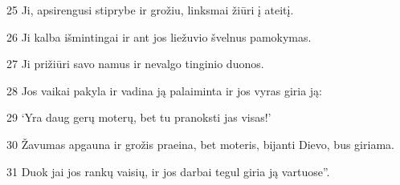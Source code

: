 \par 25 Ji, apsirengusi stiprybe ir grožiu, linksmai žiūri į ateitį. 
\par 26 Ji kalba išmintingai ir ant jos liežuvio švelnus pamokymas. 
\par 27 Ji prižiūri savo namus ir nevalgo tinginio duonos. 
\par 28 Jos vaikai pakyla ir vadina ją palaiminta ir jos vyras giria ją: 
\par 29 ‘Yra daug gerų moterų, bet tu pranoksti jas visas!’ 
\par 30 Žavumas apgauna ir grožis praeina, bet moteris, bijanti Dievo, bus giriama. 
\par 31 Duok jai jos rankų vaisių, ir jos darbai tegul giria ją vartuose”.



